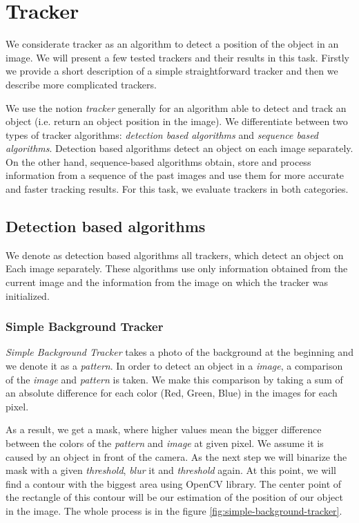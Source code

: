 \chapter{Tracker}

We considerate tracker as an algorithm to detect a position of the object in
an image. We will present a few tested trackers and their results in this task.
Firstly we provide a short description of a simple straightforward tracker and
then we describe more complicated trackers.

We use the notion \emph{tracker} generally for an algorithm able to detect and
track an object (i.e. return an object position in the image).  We
differentiate between two types of tracker algorithms: \emph{detection based
algorithms} and \emph{sequence based algorithms}. Detection based algorithms
detect an object on each image separately. On the other hand, sequence-based
algorithms obtain, store and process information from a sequence of the past
images and use them for more accurate and faster tracking results. For this
task, we evaluate trackers in both categories.


\section {Detection based algorithms}
We denote as detection based algorithms all trackers, which detect an object on
Each image separately. These algorithms use only information obtained from
the current image and the information from the image on which the tracker was
initialized.

\subsection{Simple Background Tracker}

\emph{Simple Background Tracker} takes a photo of the background at the
beginning and we denote it as a \emph{pattern}. In order to detect an object in
a \emph{image}, a comparison of the \emph{image} and \emph{pattern} is taken.
We make this comparison by taking a sum of an absolute difference for each
color (Red, Green, Blue) in the images for each pixel.

As a result, we get a mask, where higher values mean the bigger difference between
the colors of the \emph{pattern} and \emph{image} at given pixel. We assume it
is caused by an object in front of the camera.  As the next step we will
binarize the mask with a given \emph{threshold}, \emph{blur} it and
\emph{threshold} again. At this point, we will find a contour with the biggest
area using OpenCV library. The center point of the rectangle of this contour
will be our estimation of the position of our object in the image. The whole
process is in the figure \ref{fig:simple-background-tracker}.

